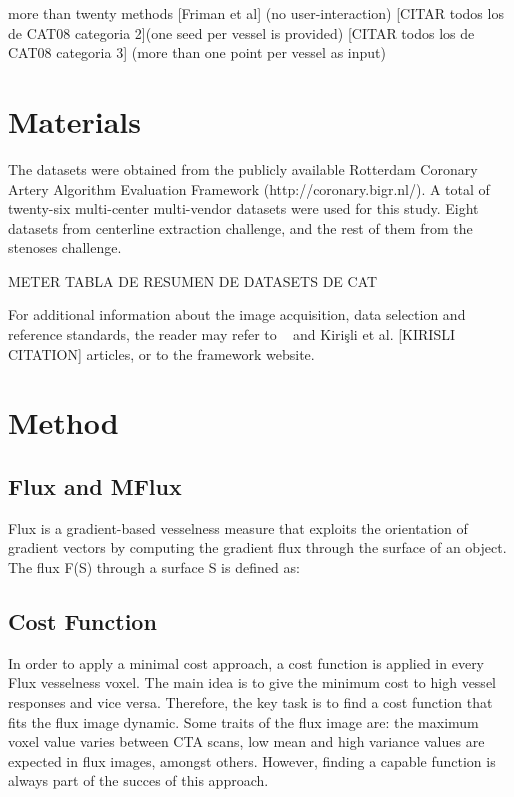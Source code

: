 more than twenty methods 
[Friman et al] (no user-interaction)
 [CITAR todos los de CAT08 categoria 2](one seed per vessel is provided)
[CITAR todos los de CAT08 categoria 3]  (more than one point per vessel as input)

\section{Materials}
 
The datasets were obtained from the publicly available Rotterdam Coronary Artery Algorithm Evaluation Framework (http://coronary.bigr.nl/). A total of twenty-six multi-center multi-vendor datasets were used for this study. Eight datasets from centerline extraction challenge, and the rest of them from the stenoses challenge. 

METER TABLA DE RESUMEN DE DATASETS DE CAT

For additional information about the image acquisition, data selection and reference standards, the reader may refer to ~\citep{Metz2008} and Kirişli et al. [KIRISLI CITATION] articles, or to the framework website.


\section{Method}

\subsection{Flux and MFlux}

Flux is a gradient-based vesselness measure that exploits the orientation of gradient vectors by computing the gradient flux through the surface of an object. The flux F(S) through a surface S is defined as:



\subsection{Cost Function}

In order to apply a minimal cost approach, a cost function is applied in every Flux vesselness voxel. The main idea is to give the minimum cost to high vessel responses and vice versa. Therefore, the key task is to find a cost function that fits the flux image dynamic. Some traits of the flux image are: the maximum voxel value varies between CTA scans, low mean and high variance values are expected in flux images, amongst others. However, finding a capable function is always part of the succes of this approach.

